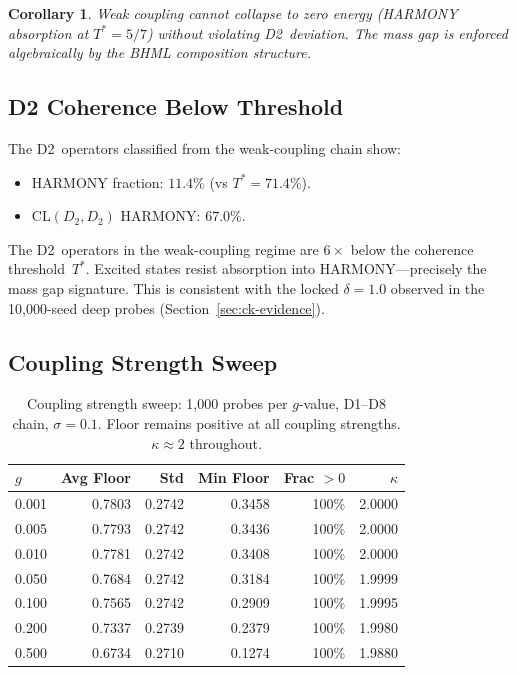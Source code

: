 \documentclass[11pt]{article}
\newtheorem{corollary}[theorem]{Corollary}
\begin{document}
\begin{corollary}
Weak coupling cannot collapse to zero energy (HARMONY absorption
at $T^* = 5/7$) without violating D2~deviation.  The mass gap
is enforced algebraically by the BHML composition structure.
\end{corollary}

\subsection{D2 Coherence Below Threshold}
\label{ssec:ym3-coherence}

The D2~operators classified from the weak-coupling chain show:
\begin{itemize}
  \item HARMONY fraction: $11.4\%$ (vs $T^* = 71.4\%$).
  \item CL$(D_2, D_2)$ HARMONY: $67.0\%$.
\end{itemize}

The D2~operators in the weak-coupling regime are $6\times$ below
the coherence threshold~$T^*$.  Excited states resist absorption
into HARMONY---precisely the mass gap signature.  This is
consistent with the locked $\delta = 1.0$ observed in the
10{,}000-seed deep probes (Section~\ref{sec:ck-evidence}).

\subsection{Coupling Strength Sweep}
\label{ssec:ym3-coupling-sweep}

\begin{table}[h]
\centering
\begin{tabular}{l r r r r r}
\toprule
$g$ & Avg Floor & Std & Min Floor & Frac $>0$ & $\kappa$ \\
\midrule
0.001  & 0.7803 & 0.2742 & 0.3458 & 100\% & 2.0000 \\
0.005  & 0.7793 & 0.2742 & 0.3436 & 100\% & 2.0000 \\
0.010  & 0.7781 & 0.2742 & 0.3408 & 100\% & 2.0000 \\
0.050  & 0.7684 & 0.2742 & 0.3184 & 100\% & 1.9999 \\
0.100  & 0.7565 & 0.2742 & 0.2909 & 100\% & 1.9995 \\
0.200  & 0.7337 & 0.2739 & 0.2379 & 100\% & 1.9980 \\
0.500  & 0.6734 & 0.2710 & 0.1274 & 100\% & 1.9880 \\
\bottomrule
\end{tabular}
\caption{Coupling strength sweep: 1{,}000 probes per $g$-value,
D1--D8 chain, $\sigma=0.1$.  Floor remains positive at all
coupling strengths.  $\kappa \approx 2$ throughout.}
\label{tab:coupling-sweep}
\end{table}
\end{document}
